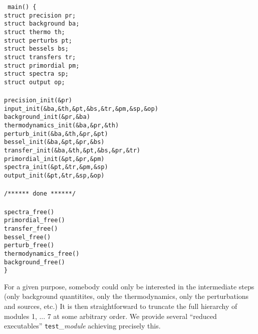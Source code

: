 \documentclass{article}
\begin{document}
\vspace{0.5cm}

\noindent
{\tt
main() \{ \\
\indent  struct precision pr;\\
\indent  struct background ba;\\
\indent  struct thermo th;     \\
\indent  struct perturbs pt;   \\
\indent  struct bessels bs;    \\
\indent  struct transfers tr;  \\
\indent  struct primordial pm;  \\
\indent  struct spectra sp;     \\
\indent  struct output op;      \\
 \\
\indent  precision\_init(\&pr)\\
\indent  input\_init(\&ba,\&th,\&pt,\&bs,\&tr,\&pm,\&sp,\&op)\\
\indent  background\_init(\&pr,\&ba)\\
\indent  thermodynamics\_init(\&ba,\&pr,\&th)\\
\indent  perturb\_init(\&ba,\&th,\&pr,\&pt)\\
\indent  bessel\_init(\&ba,\&pt,\&pr,\&bs)\\
\indent  transfer\_init(\&ba,\&th,\&pt,\&bs,\&pr,\&tr)\\
\indent  primordial\_init(\&pt,\&pr,\&pm)\\
\indent  spectra\_init(\&pt,\&tr,\&pm,\&sp)\\
\indent  output\_init(\&pt,\&tr,\&sp,\&op)\\
\\
\indent  /****** done ******/\\
\\
\indent  spectra\_free()\\
\indent  primordial\_free()\\
\indent  transfer\_free()\\
\indent  bessel\_free()\\
\indent  perturb\_free()\\
\indent  thermodynamics\_free()\\
\indent background\_free()\\
\}
}

\vspace{0.5cm}

For a given purpose, somebody could only be interested in the
intermediate steps (only background quantitites, only the
thermodynamics, only the perturbations and sources, etc.) It is
then straightforward to truncate the full hierarchy of modules 1, ... 7 at some
arbitrary order. We provide several ``reduced executables'' 
{\tt test}\_{\it module} achieving precisely this.
\end{document}
